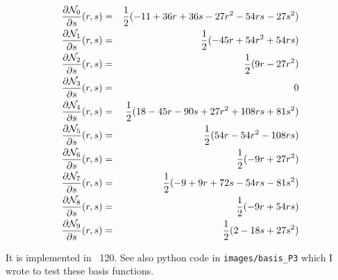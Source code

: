\begin{eqnarray}
\frac{\partial{\mathcal{N}}_0}{\partial s} (r,s) &=& \frac12(-11+36r+36s-27r^2-54rs-27s^2)   \nonumber\\
\frac{\partial{\mathcal{N}}_1}{\partial s} (r,s) &=& \frac12(-45r+54r^2+54rs)   \nonumber\\
\frac{\partial{\mathcal{N}}_2}{\partial s} (r,s) &=& \frac12(9r-27r^2)   \nonumber\\
\frac{\partial{\mathcal{N}}_3}{\partial s} (r,s) &=& 0   \nonumber\\
\frac{\partial{\mathcal{N}}_4}{\partial s} (r,s) &=& \frac12(18-45r-90s+27r^2+108rs+81s^2)   \nonumber\\
\frac{\partial{\mathcal{N}}_5}{\partial s} (r,s) &=& \frac12(54r-54r^2-108rs)   \nonumber\\
\frac{\partial{\mathcal{N}}_6}{\partial s} (r,s) &=& \frac12(-9r+27r^2)   \nonumber\\
\frac{\partial{\mathcal{N}}_7}{\partial s} (r,s) &=& \frac12(-9+9r+72s-54rs-81s^2)   \nonumber\\
\frac{\partial{\mathcal{N}}_8}{\partial s} (r,s) &=& \frac12(-9r+54rs)   \nonumber\\
\frac{\partial{\mathcal{N}}_9}{\partial s} (r,s) &=& \frac12(2-18s+27s^2)   \nonumber
\end{eqnarray}

It is implemented in \stone~120.
See also python code in {\tt images/basis\_P3} which I wrote to test these basis functions.


















